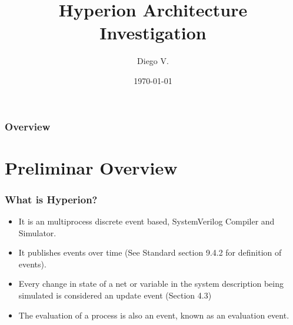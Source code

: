 \documentclass{beamer}
\title[Short title]{Hyperion Architecture Investigation} %
\author{Diego V.} %
\date{\today} %
\begin{document}
\begin{frame}
\titlepage %
\end{frame}

\begin{frame}
\frametitle{Overview} %
\tableofcontents %
\end{frame}


\section{Preliminar Overview} %

\begin{frame}
\frametitle{What is Hyperion?}
\begin{itemize}
\item It is an multiprocess discrete event based, SystemVerilog Compiler and Simulator.
\item It publishes events over time (See Standard section 9.4.2 for definition of events).
\item Every change in state of a net or variable in the system description being simulated is considered an update event (Section 4.3)
\item The evaluation of a process is also an event, known as an evaluation event.
\end{itemize}
\end{frame}

\end{document}
